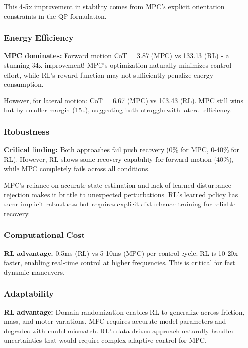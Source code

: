 \documentclass[12pt,a4paper]{article}
\begin{document}
This 4-5x improvement in stability comes from MPC's explicit orientation constraints in the QP formulation.

\subsubsection{Energy Efficiency}

\textbf{MPC dominates:} Forward motion CoT = 3.87 (MPC) vs 133.13 (RL) - a stunning 34x improvement! MPC's optimization naturally minimizes control effort, while RL's reward function may not sufficiently penalize energy consumption.

However, for lateral motion: CoT = 6.67 (MPC) vs 103.43 (RL). MPC still wins but by smaller margin (15x), suggesting both struggle with lateral efficiency.

\subsubsection{Robustness}

\textbf{Critical finding:} Both approaches fail push recovery (0\% for MPC, 0-40\% for RL). However, RL shows some recovery capability for forward motion (40\%), while MPC completely fails across all conditions.

MPC's reliance on accurate state estimation and lack of learned disturbance rejection makes it brittle to unexpected perturbations. RL's learned policy has some implicit robustness but requires explicit disturbance training for reliable recovery.

\subsubsection{Computational Cost}

\textbf{RL advantage:} 0.5ms (RL) vs 5-10ms (MPC) per control cycle. RL is 10-20x faster, enabling real-time control at higher frequencies. This is critical for fast dynamic maneuvers.

\subsubsection{Adaptability}

\textbf{RL advantage:} Domain randomization enables RL to generalize across friction, mass, and motor variations. MPC requires accurate model parameters and degrades with model mismatch. RL's data-driven approach naturally handles uncertainties that would require complex adaptive control for MPC.
\end{document}
